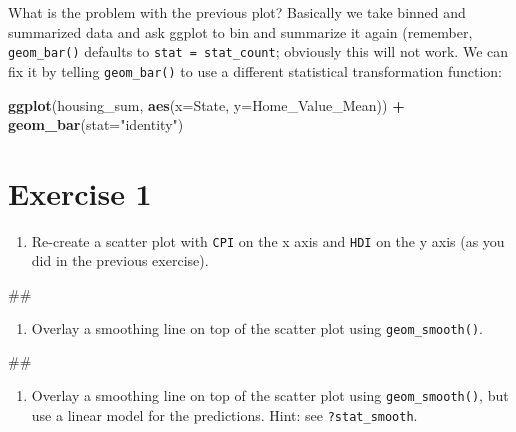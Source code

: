 \documentclass[]{book}
\newenvironment{Shaded}{\begin{snugshade}}{\end{snugshade}}
\newcommand{\KeywordTok}[1]{\textcolor[rgb]{0.13,0.29,0.53}{\textbf{#1}}}
\newcommand{\DataTypeTok}[1]{\textcolor[rgb]{0.13,0.29,0.53}{#1}}
\newcommand{\StringTok}[1]{\textcolor[rgb]{0.31,0.60,0.02}{#1}}
\newcommand{\OperatorTok}[1]{\textcolor[rgb]{0.81,0.36,0.00}{\textbf{#1}}}
\newcommand{\NormalTok}[1]{#1}
\providecommand{\tightlist}{%
  \setlength{\itemsep}{0pt}\setlength{\parskip}{0pt}}
\begin{document}
What is the problem with the previous plot? Basically we take binned and
summarized data and ask ggplot to bin and summarize it again (remember,
\texttt{geom\_bar()} defaults to \texttt{stat\ =\ stat\_count};
obviously this will not work. We can fix it by telling
\texttt{geom\_bar()} to use a different statistical transformation
function:

\begin{Shaded}
\begin{Highlighting}[]
\KeywordTok{ggplot}\NormalTok{(housing_sum, }\KeywordTok{aes}\NormalTok{(}\DataTypeTok{x=}\NormalTok{State, }\DataTypeTok{y=}\NormalTok{Home_Value_Mean)) }\OperatorTok{+}\StringTok{ }
\StringTok{  }\KeywordTok{geom_bar}\NormalTok{(}\DataTypeTok{stat=}\StringTok{"identity"}\NormalTok{)}
\end{Highlighting}
\end{Shaded}

\section{Exercise 1}\label{exercise-1-2}

\begin{enumerate}
\def\labelenumi{\arabic{enumi}.}
\tightlist
\item
  Re-create a scatter plot with \texttt{CPI} on the x axis and
  \texttt{HDI} on the y axis (as you did in the previous exercise).
\end{enumerate}

\begin{Shaded}
\begin{Highlighting}[]
\NormalTok{## }
\end{Highlighting}
\end{Shaded}

\begin{enumerate}
\def\labelenumi{\arabic{enumi}.}
\setcounter{enumi}{1}
\tightlist
\item
  Overlay a smoothing line on top of the scatter plot using
  \texttt{geom\_smooth()}.
\end{enumerate}

\begin{Shaded}
\begin{Highlighting}[]
\NormalTok{## }
\end{Highlighting}
\end{Shaded}

\begin{enumerate}
\def\labelenumi{\arabic{enumi}.}
\setcounter{enumi}{2}
\tightlist
\item
  Overlay a smoothing line on top of the scatter plot using
  \texttt{geom\_smooth()}, but use a linear model for the predictions.
  Hint: see \texttt{?stat\_smooth}.
\end{enumerate}
\end{document}
